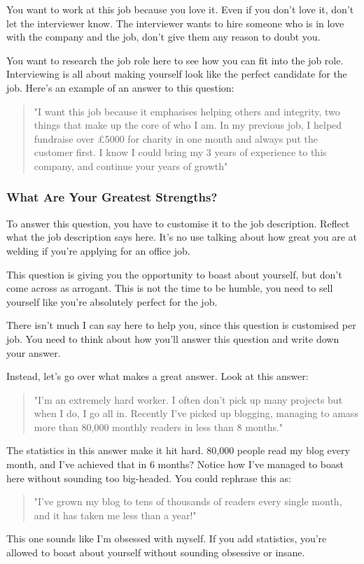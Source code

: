 \documentclass{article}
\begin{document}
You want to work at this job because you love it. Even if you don't love
it, don't let the interviewer know. The interviewer wants to hire
someone who is in love with the company and the job, don't give them any
reason to doubt you.

You want to research the job role here to see how you can fit into the
job role. Interviewing is all about making yourself look like the
perfect candidate for the job. Here's an example of an answer to this
question:

\begin{quote}
"I want this job because it emphasises helping others and integrity,
two things that make up the core of who I am. In my previous job, I
helped fundraise over £5000 for charity in one month and always put the
customer first. I know I could bring my 3 years of experience to this
company, and continue your years of growth"
\end{quote}
\subsubsection{What Are Your Greatest Strengths?}
To answer this question, you have to customise it to the job
description. Reflect what the job description says here. It's no use
talking about how great you are at welding if you're applying for an
office job.

This question is giving you the opportunity to boast about yourself, but
don't come across as arrogant. This is not the time to be humble, you
need to sell yourself like you're absolutely perfect for the job.

There isn't much I can say here to help you, since this question is
customised per job. You need to think about how you'll answer this
question and write down your answer.

Instead, let's go over what makes a great answer. Look at this answer:

\begin{quote}
"I'm an extremely hard worker. I often don't pick up many projects but
when I do, I go all in. Recently I've picked up blogging, managing to
amass more than 80,000 monthly readers in less than 8 months."
\end{quote}
The statistics in this answer make it hit hard. 80,000 people read my
blog every month, and I've achieved that in 6 months? Notice how I've
managed to boast here without sounding too big-headed. You could
rephrase this as:
\begin{quote}
    "I've grown my blog to tens of thousands of readers every single month,
and it has taken me less than a year!"
\end{quote}
This one sounds like I'm obsessed with myself. If you add statistics,
you're allowed to boast about yourself without sounding obsessive or
insane.
\end{document}
